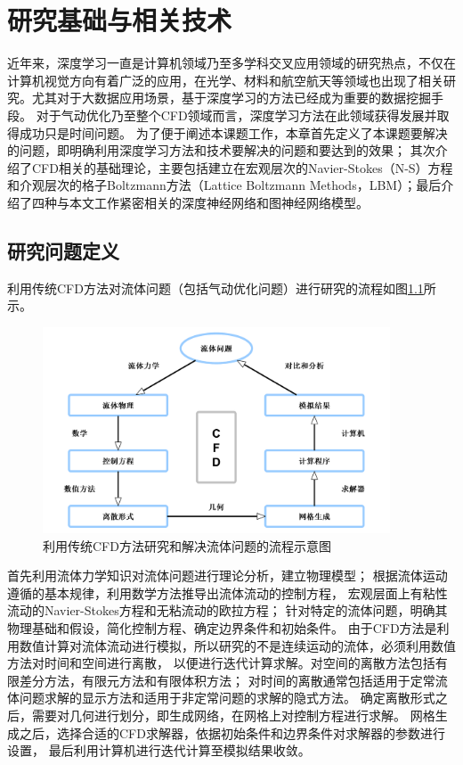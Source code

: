 \chapter{研究基础与相关技术}

近年来，深度学习一直是计算机领域乃至多学科交叉应用领域的研究热点，不仅在计算机视觉方向有着广泛的应用，在光学、材料和航空航天等领域也出现了相关研究。尤其对于大数据应用场景，基于深度学习的方法已经成为重要的数据挖掘手段。
对于气动优化乃至整个CFD领域而言，深度学习方法在此领域获得发展并取得成功只是时间问题。
为了便于阐述本课题工作，本章首先定义了本课题要解决的问题，即明确利用深度学习方法和技术要解决的问题和要达到的效果；
其次介绍了CFD相关的基础理论，主要包括建立在宏观层次的Navier-Stokes（N-S）方程和介观层次的格子Boltzmann方法（Lattice Boltzmann Methods，LBM）；最后介绍了四种与本文工作紧密相关的深度神经网络和图神经网络模型。

\section{研究问题定义}
利用传统CFD方法对流体问题（包括气动优化问题）进行研究的流程如图\ref{fig:cfdflow}所示。
\begin{figure}[htp]
	\centering
	\includegraphics[width=0.92\textwidth]{figures/cfdflow.pdf}
	\caption{利用传统CFD方法研究和解决流体问题的流程示意图}
	\label{fig:cfdflow}
\end{figure}


首先利用流体力学知识对流体问题进行理论分析，建立物理模型；
根据流体运动遵循的基本规律，利用数学方法推导出流体流动的控制方程，
宏观层面上有粘性流动的Navier-Stokes方程和无粘流动的欧拉方程；
针对特定的流体问题，明确其物理基础和假设，简化控制方程、确定边界条件和初始条件。
由于CFD方法是利用数值计算对流体流动进行模拟，所以研究的不是连续运动的流体，必须利用数值方法对时间和空间进行离散，
以便进行迭代计算求解。对空间的离散方法包括有限差分方法，有限元方法和有限体积方法；
对时间的离散通常包括适用于定常流体问题求解的显示方法和适用于非定常问题的求解的隐式方法。
确定离散形式之后，需要对几何进行划分，即生成网络，在网格上对控制方程进行求解。
网格生成之后，选择合适的CFD求解器，依据初始条件和边界条件对求解器的参数进行设置，
最后利用计算机进行迭代计算至模拟结果收敛。



